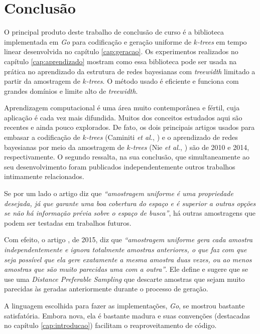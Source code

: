 \chapter{Conclusão}
\label{cap:conclusao}

O principal produto deste trabalho de conclusão de curso é a biblioteca implementada em \emph{Go} para codificação e geração uniforme de \emph{$k$-trees} em tempo linear desenvolvida no capítulo \ref{cap:geracao}. Os experimentos realizados no capítulo \ref{cap:aprendizado} mostram como essa biblioteca pode ser usada na prática no aprendizado da estrutura de redes bayesianas com \emph{treewidth} limitado a partir da amostragem de \emph{$k$-trees}. O método usado é eficiente e funciona com grandes domínios e limite alto de \emph{treewidth}.

Aprendizagem computacional é uma área muito contemporânea e fértil, cuja aplicação é cada vez mais difundida. Muitos dos conceitos estudados aqui são recentes e ainda pouco explorados. De fato, os dois principais artigos usados para embasar a codificação de \emph{$k$-trees} (Caminiti \emph{et al.}, \cite{caminiti}) e o aprendizado de redes bayesianas por meio da amostragem de \emph{$k$-trees} (Nie \emph{et al.}, \cite{maua}) são de 2010 e 2014, respectivamente. O segundo ressalta, na sua conclusão, que simultaneamente ao seu desenvolvimento foram publicados independentemente outros trabalhos intimamente relacionados.

Se por um lado o artigo \cite{maua} diz que \emph{``amostragem uniforme é uma propriedade desejada, já que garante uma boa cobertura do espaço e é superior a outras opções se não há informação prévia sobre o espaço de busca''}, há outras amostragens que podem ser testadas em trabalhos futuros.

Com efeito, o artigo \cite{nie}, de 2015, diz que \emph{``amostragem uniforme gera cada amostra independentemente e ignora totalmente amostras anteriores, o que faz com que seja possível que ela gere exatamente a mesma amostra duas vezes, ou ao menos amostras que são muito parecidas uma com a outra''}. Ele define e sugere que se use uma \emph{Distance Preferable Sampling} que descarte amostras que sejam muito parecidas às geradas anteriormente durante o processo de geração.

A linguagem escolhida para fazer as implementações, \emph{Go}, se mostrou bastante satisfatória. Embora nova, ela é bastante madura e suas convenções (destacadas no capítulo \ref{cap:introducao}) facilitam o reaproveitamento de código.
